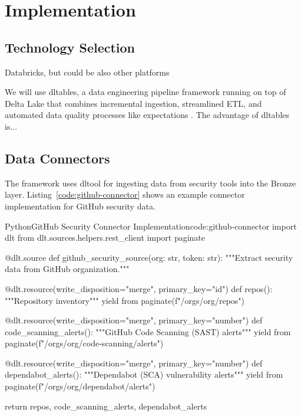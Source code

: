 \chapter{Implementation}
\label{ch:implementation}

\section{Technology Selection}

Databricks, but could be also other platforms

We will use \gls{dltables}, a data engineering pipeline framework running on top of Delta Lake that combines incremental ingestion, streamlined ETL, and automated data quality processes like expectations \cite{Lee2024}. The advantage of \gls{dltables} is...

\section{Data Connectors}

The framework uses \gls{dltool} for ingesting data from security tools into the Bronze layer. Listing~\ref{code:github-connector} shows an example connector implementation for GitHub security data.

\begin{code}{Python}{GitHub Security Connector Implementation}{code:github-connector}
import dlt
from dlt.sources.helpers.rest_client import paginate

@dlt.source
def github_security_source(org: str, token: str):
    """Extract security data from GitHub organization."""

    @dlt.resource(write_disposition="merge", primary_key="id")
    def repos():
        """Repository inventory"""
        yield from paginate(f"/orgs/{org}/repos")

    @dlt.resource(write_disposition="merge", primary_key="number")
    def code_scanning_alerts():
        """GitHub Code Scanning (SAST) alerts"""
        yield from paginate(f"/orgs/{org}/code-scanning/alerts")

    @dlt.resource(write_disposition="merge", primary_key="number")
    def dependabot_alerts():
        """Dependabot (SCA) vulnerability alerts"""
        yield from paginate(f"/orgs/{org}/dependabot/alerts")

    return repos, code_scanning_alerts, dependabot_alerts
\end{code}